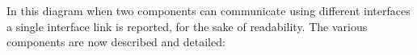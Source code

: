 \documentclass[a4paper]{report}
\begin{document}
In this diagram when two components can communicate using different interfaces a single interface link is 
reported, for the sake of readability. The various components are now described and detailed:
\end{document}

